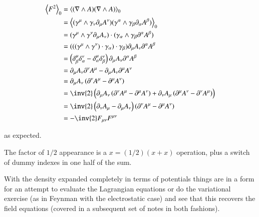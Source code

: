\begin{align*}
\gpgradezero{ F^2 }
&= \gpgradezero{ (\grad \wedge A)(\grad \wedge A) } \\
&= \gpgradezero{ (\gamma^{\mu} \wedge \gamma_{\nu} \partial_{\mu} A^{\nu}) (\gamma^{\alpha} \wedge \gamma_{\beta} \partial_{\alpha} A^{\beta}) } \\
&= (\gamma^{\mu} \wedge \gamma^{\nu} \partial_{\mu} A_{\nu}) \cdot (\gamma_{\alpha} \wedge \gamma_{\beta} \partial^{\alpha} A^{\beta}) \\
&= ( ( (\gamma^{\mu} \wedge \gamma^{\nu}) \cdot \gamma_{\alpha} ) \cdot \gamma_{\beta} ) \partial_{\mu} A_{\nu} \partial^{\alpha} A^{\beta} \\
&= \left( \delta^{\mu}_{\beta} \delta^{\nu}_{\alpha} - \delta^{\mu}_{\alpha} \delta^{\nu}_{\beta} \right) \partial_{\mu} A_{\nu} \partial^{\alpha} A^{\beta} \\
&= \partial_{\mu} A_{\nu} \partial^{\nu} A^{\mu} - \partial_{\mu} A_{\nu} \partial^{\mu} A^{\nu} \\
&= \partial_{\mu} A_{\nu} \left( \partial^{\nu} A^{\mu} - \partial^{\mu} A^{\nu} \right) \\
&= 
\inv{2} \left( \partial_{\mu} A_{\nu} \left( \partial^{\nu} A^{\mu} - \partial^{\mu} A^{\nu} \right) 
+\partial_{\nu} A_{\mu} \left( \partial^{\mu} A^{\nu} - \partial^{\nu} A^{\mu} \right) \right)
\\
&= \inv{2} \left( \partial_{\nu} A_{\mu} - \partial_{\mu} A_{\nu} \right) \left( \partial^{\nu} A^{\mu} - \partial^{\mu} A^{\nu} \right) \\
&= -\inv{2} F_{\mu\nu}F^{\mu\nu}
\end{align*}

as expected.

The factor of $1/2$ appearance is a $x = (1/2)(x + x)$ operation, plus a switch of dummy indexes in one half of the sum.

With the density expanded completely in terms of potentials things are in a form for an attempt to 
evaluate the Lagrangian equations or do the 
variational exercise (as in Feynman 
\cite{feynman1963flp}
with the electrostatic case) and see that this recovers the field equations (covered in a subsequent set of notes in both fashions).
